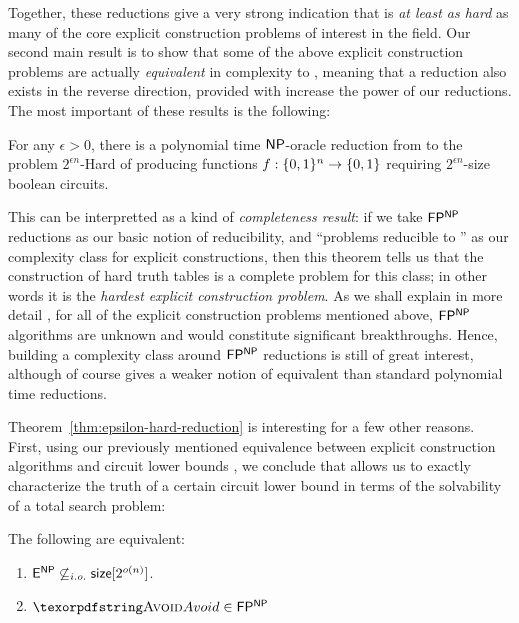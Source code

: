 Together, these reductions give a very strong indication that \avoid is \emph{at least as hard} as many of the core explicit construction problems of interest in the field. Our second main result is to show that some of the above explicit construction problems are actually \emph{equivalent} in complexity to \avoid, meaning that a reduction also exists in the reverse direction, provided with increase the power of our reductions. The most important of these results is the following:
\begin{theorem*}
For any $\epsilon > 0$, there is a polynomial time $\cl{NP}$-oracle reduction from \avoid to the problem {\sc $2^{\epsilon n}$-Hard} of producing functions $f: \{0,1\}^n \to \{0,1\}$ requiring $2^{\epsilon n}$-size boolean circuits.
\end{theorem*}
This can be interpretted as a kind of \emph{completeness result}: if we take $\cl{FP^{NP}}$ reductions as our basic notion of reducibility, and ``problems reducible to \avoid'' as our complexity class for explicit constructions, then this theorem tells us that the construction of hard truth tables is a complete problem for this class; in other words it is the \emph{hardest explicit construction problem}. As we shall explain in more detail , for all of the explicit construction problems mentioned above, $\cl{FP^{NP}}$ algorithms are unknown and would constitute significant breakthroughs. Hence, building a complexity class around $\cl{FP^{NP}}$ reductions is still of great interest, although of course gives a weaker notion of equivalent than standard polynomial time reductions. 

Theorem~\ref{thm:epsilon-hard-reduction} is interesting for a few other reasons. First, using our previously mentioned equivalence between explicit construction algorithms and circuit lower bounds , we conclude that \avoid allows us to exactly characterize the truth of a certain circuit lower bound in terms of the solvability of a total search problem:

\begin{theorem*}
The following are equivalent:
\begin{enumerate}
    \item $\cl{E^{NP}} \not\subseteq_{i.o.} \cl{size}[2^{o(n)}]$.
    \item $\avoid \in \cl{FP^{NP}}$
\end{enumerate}
\end{theorem*}

